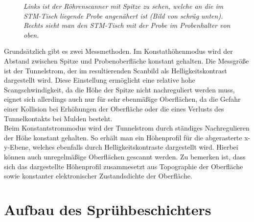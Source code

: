 \begin{figure}[H]
\centering
\sffamily

\caption{\textit{Links ist der Röhrenscanner mit Spitze zu sehen, welche an die im STM-Tisch
liegende Probe angenähert ist (Bild von schräg unten). Rechts sieht man den STM-Tisch mit der
Probe im Probenhalter von oben.}}
\label{stmaufbau}
\end{figure}

Grundsätzlich gibt es zwei Messmethoden. Im Konstathöhenmodus wird der Abstand zwischen Spitze und
Probenoberfläche konstant gehalten. Die Messgröße ist der Tunnelstrom, der im resultierenden
Scanbild als Helligkeitskontrast dargestellt wird. Diese Einstellung ermöglicht eine relative hohe
Scangschwindigkeit, da die Höhe der Spitze nicht nachreguliert werden muss, eignet sich
allerdings auch nur für sehr ebenmäßige Oberflächen, da die Gefahr einer Kollision bei Erhöhungen
der Oberfläche oder die eines Verlusts des Tunnelkontakts bei Mulden besteht.\\
Beim Konstantstrommodus wird der Tunnelstrom durch ständiges Nachregulieren der Höhe konstant
gehalten. So erhält man ein Höhenprofil für die abgerasterte x-y-Ebene, welches ebenfalls durch
Helligkeitskontraste dargestellt wird. Hierbei können auch unregelmäßige Oberflächen gescannt
werden. Zu bemerken ist, dass sich das dargestellte Höhenprofil zusammesetzt aus Topographie der
Oberfläche sowie konstanter elektronischer Zustandsdichte der Oberfläche.


\section{Aufbau des Sprühbeschichters}
\FloatBarrier

